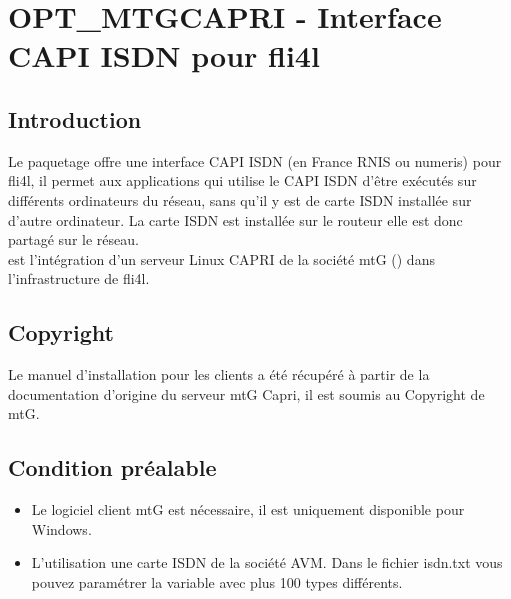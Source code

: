 {
\section {OPT\_MTGCAPRI - Interface CAPI ISDN pour fli4l}
}

\subsection{Introduction}

Le paquetage  offre une interface CAPI ISDN (en France RNIS ou numeris)
pour fli4l, il permet aux applications qui utilise le CAPI ISDN d'être exécutés sur
différents ordinateurs du réseau, sans qu'il y est de carte ISDN installée sur d'autre ordinateur.
La carte ISDN est installée sur le  routeur elle est donc partagé sur le réseau. \\
 est l'intégration d'un serveur Linux CAPRI de la société mtG
() dans l'infrastructure de fli4l.

\subsection{Copyright}
Le manuel d'installation pour les clients a été récupéré à partir de la documentation d'origine
du serveur mtG Capri, il est soumis au Copyright de mtG.

\subsection{Condition préalable}
    \begin{itemize}
        \item Le logiciel client mtG est nécessaire, il est uniquement disponible pour Windows. \\
        \item L'utilisation une carte ISDN de la société AVM. Dans le fichier isdn.txt vous pouvez
			paramétrer la variable  avec plus 100 types différents.
   \end{itemize}


